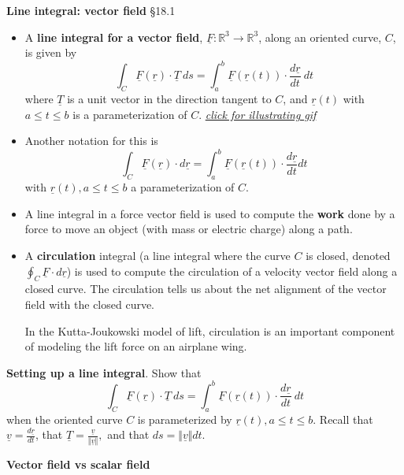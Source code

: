 \documentclass[12pt,letterpaper,noanswers]{exam}
\newcommand{\mb}[1]{\underline{#1}}
\begin{document}
\noindent\textbf{Line integral: vector field} \S 18.1
\begin{tcolorbox}
\begin{itemize}
\itemsep0em
    \item A \textbf{line integral for a vector field}, $\mb F:\mathbb{R}^3 \rightarrow \mathbb{R}^3$, along an oriented curve, $C$, is given by \[\int_C \mb F(\mb r)\cdot \mb T\ ds = \int_a^b \mb F(\mb r(t))\cdot \frac{d\mb r}{dt}\ dt\] where $\mb T$ is a unit vector in the direction tangent to $C$, and $\mb r(t)$ with $a\leq t\leq b$ is a parameterization of $C$. \href{https://upload.wikimedia.org/wikipedia/commons/b/b0/Line_integral_of_vector_field.gif}{\emph{click for illustrating gif}}
    \item Another notation for this is \[\int_C \mb F(\mb r)\cdot d\mb r = \int_a^b \mb F(\mb r(t)) \cdot \frac{d\mb r}{dt}dt\] with $\mb r(t), a\leq t\leq b$ a parameterization of $C$.
\end{itemize}



\tcblower

\begin{itemize}
\itemsep0em
    \item A line integral in a force vector field is used to compute the \textbf{work} done by a force to move an object (with mass or electric charge) along a path.

\item A \textbf{circulation} integral (a line integral where the curve $C$ is closed, denoted $\oint_C \mb F\cdot d\mb r$) is used to compute the circulation of a velocity vector field along a closed curve.  The circulation tells us about the net alignment of the vector field with the closed curve.

In the Kutta-Joukowski model of lift, circulation is an important component of modeling the lift force on an airplane wing.
\end{itemize}
\end{tcolorbox}

\noindent\textbf{Setting up a line integral}. 
Show that
\[\int_C \mb F(\mb r)\cdot \mb T\ ds = \int_a^b \mb F(\mb r(t))\cdot \frac{d\mb r}{dt}\ dt\] when the oriented curve $C$ is parameterized by $\mb r(t), a\leq t\leq b$. 
Recall that $\displaystyle\mb v = \frac{d\mb r}{dt}$, that $\displaystyle\mb T = \frac{\mb v}{\Vert\mb v\Vert},$ and that $\displaystyle ds = \Vert \mb v\Vert dt$.
\vspace{1in}


\noindent\textbf{Vector field vs scalar field}
\end{document}
